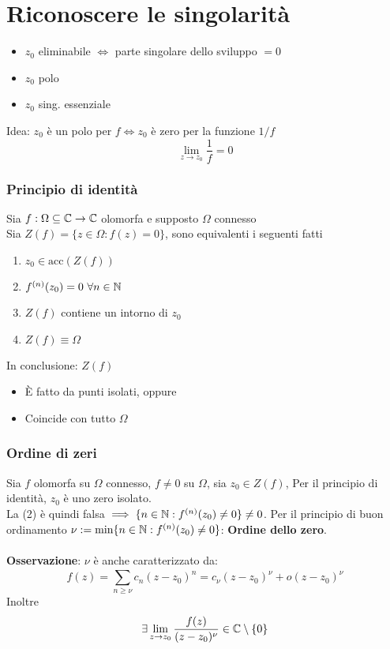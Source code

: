 
\section{Riconoscere le singolarità}
\begin{itemize}
	\item $z_0$ eliminabile $\iff$ parte singolare dello sviluppo $=0$
	\item $z_0$ polo 
	\item $z_0$ sing. essenziale 
\end{itemize}
Idea: $z_0$ è un polo per $f\iff z_0 $ è zero per la funzione $1/f$
\[\lim_{z \to z_0} \frac{1}{f}=0\]
\subsubsection{Principio di identità}
Sia $f:\Omega \subseteq  \mathbb{C}\to \mathbb{C}$ olomorfa e supposto $\Omega$ connesso
\\Sia $Z(f)=\{z\in\Omega : f(z)=0\} $, sono equivalenti i seguenti fatti
\begin{enumerate}
	
	\item $z_0\in \text{acc}(Z(f))$
	\item $f^{(n)}(z_0)=0\ \forall n\in\mathbb{N}$
	\item $Z(f)$ contiene un intorno di $z_0$
	\item $Z(f)\equiv\Omega$
\end{enumerate}
In conclusione: $Z(f)$
\begin{itemize}
	\item È fatto da punti isolati, oppure 
	\item Coincide con tutto $\Omega$ 
\end{itemize}
\subsubsection{Ordine di zeri}
Sia $f$ olomorfa su $\Omega$ connesso, $f\neq 0$ su $\Omega$, sia $z_0\in Z(f)$, Per il principio di identità, $z_0$ è uno zero isolato.
\\La (2) è quindi falsa $\implies \{n\in\mathbb{N}: f^{(n)}(z_0)\neq 0\} \neq 0$. Per il principio di buon ordinamento $\nu := \text{min}\{n\in\mathbb{N}: f^{(n)}(z_0)\neq 0\} $: \textbf{Ordine dello zero}.\\
\\\textbf{Osservazione}: $\nu$ è anche caratterizzato da:
\[f(z)=\sum_{n\ge \nu}^{} c_n(z-z_0)^n=c_\nu(z-z_0)^\nu+o(z-z_0)^\nu\]
Inoltre
\[\exists \lim_{z \to z_0} \frac{f(z)}{(z-z_0)^\nu}\in\mathbb{C}\setminus \{0\} \]
